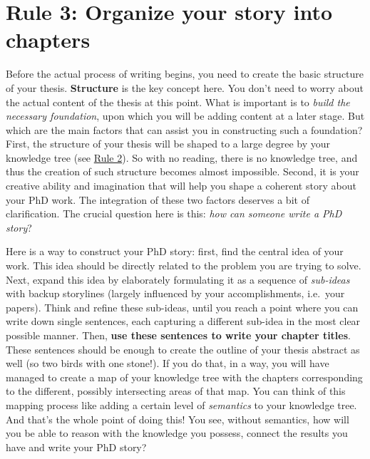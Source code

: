 \documentclass[
  12pt,
]{book}
\begin{document}
\hypertarget{rule3}{%
\section*{\texorpdfstring{\textbf{Rule 3:} Organize your story into chapters}{Rule 3: Organize your story into chapters}}\label{rule3}}

Before the actual process of writing begins, you need to create the basic structure of your thesis.
\textbf{Structure} is the key concept here.
You don't need to worry about the actual content of the thesis at this point.
What is important is to \emph{build the necessary foundation}, upon which you will be adding content at a later stage.
But which are the main factors that can assist you in constructing such a foundation?
First, the structure of your thesis will be shaped to a large degree by your knowledge tree (see \protect\hyperlink{rule2}{Rule 2}).
So with no reading, there is no knowledge tree, and thus the creation of such structure becomes almost impossible.
Second, it is your creative ability and imagination that will help you shape a coherent story about your PhD work.
The integration of these two factors deserves a bit of clarification.
The crucial question here is this: \emph{how can someone write a PhD story}?

Here is a way to construct your PhD story: first, find the central idea of your work.
This idea should be directly related to the problem you are trying to solve.
Next, expand this idea by elaborately formulating it as a sequence of \emph{sub-ideas} with backup storylines (largely influenced by your accomplishments, i.e.~your papers).
Think and refine these sub-ideas, until you reach a point where you can write down single sentences, each capturing a different sub-idea in the most clear possible manner.
Then, \textbf{use these sentences to write your chapter titles}.
These sentences should be enough to create the outline of your thesis abstract as well (so two birds with one stone!).
If you do that, in a way, you will have managed to create a map of your knowledge tree with the chapters corresponding to the different, possibly intersecting areas of that map.
You can think of this mapping process like adding a certain level of \emph{semantics} to your knowledge tree.
And that's the whole point of doing this!
You see, without semantics, how will you be able to reason with the knowledge you possess, connect the results you have and write your PhD story?
\end{document}
